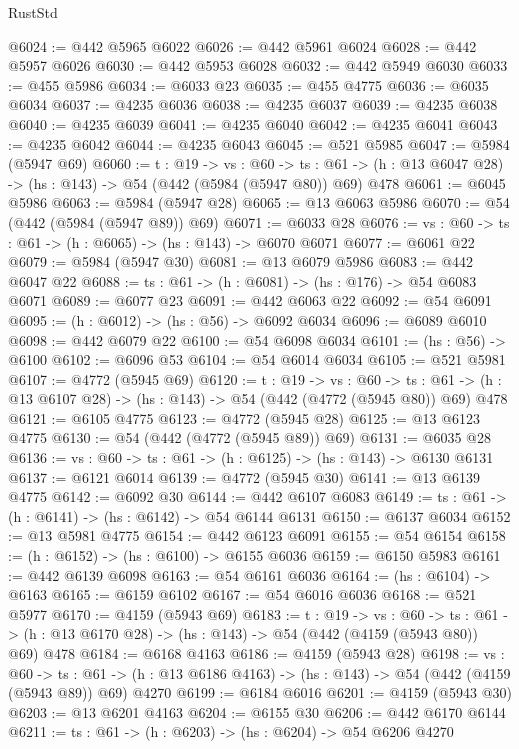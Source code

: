 \begin{lexlean}{RustStd}
\begin{coremodule}
@6024 := @442 @5965 @6022
@6026 := @442 @5961 @6024
@6028 := @442 @5957 @6026
@6030 := @442 @5953 @6028
@6032 := @442 @5949 @6030
@6033 := @455 @5986
@6034 := @6033 @23
@6035 := @455 @4775
@6036 := @6035 @6034
@6037 := @4235 @6036
@6038 := @4235 @6037
@6039 := @4235 @6038
@6040 := @4235 @6039
@6041 := @4235 @6040
@6042 := @4235 @6041
@6043 := @4235 @6042
@6044 := @4235 @6043
@6045 := @521 @5985
@6047 := @5984 (@5947 @69)
@6060 := {t : @19} ->
  {vs : @60} ->
  {ts : @61} -> (h : @13 @6047 @28) -> (hs : @143) -> @54 (@442 (@5984 (@5947 @80)) @69) @478
@6061 := @6045 @5986
@6063 := @5984 (@5947 @28)
@6065 := @13 @6063 @5986
@6070 := @54 (@442 (@5984 (@5947 @89)) @69)
@6071 := @6033 @28
@6076 := {vs : @60} -> {ts : @61} -> (h : @6065) -> (hs : @143) -> @6070 @6071
@6077 := @6061 @22
@6079 := @5984 (@5947 @30)
@6081 := @13 @6079 @5986
@6083 := @442 @6047 @22
@6088 := {ts : @61} -> (h : @6081) -> (hs : @176) -> @54 @6083 @6071
@6089 := @6077 @23
@6091 := @442 @6063 @22
@6092 := @54 @6091
@6095 := (h : @6012) -> (hs : @56) -> @6092 @6034
@6096 := @6089 @6010
@6098 := @442 @6079 @22
@6100 := @54 @6098 @6034
@6101 := (hs : @56) -> @6100
@6102 := @6096 @53
@6104 := @54 @6014 @6034
@6105 := @521 @5981
@6107 := @4772 (@5945 @69)
@6120 := {t : @19} ->
  {vs : @60} ->
  {ts : @61} -> (h : @13 @6107 @28) -> (hs : @143) -> @54 (@442 (@4772 (@5945 @80)) @69) @478
@6121 := @6105 @4775
@6123 := @4772 (@5945 @28)
@6125 := @13 @6123 @4775
@6130 := @54 (@442 (@4772 (@5945 @89)) @69)
@6131 := @6035 @28
@6136 := {vs : @60} -> {ts : @61} -> (h : @6125) -> (hs : @143) -> @6130 @6131
@6137 := @6121 @6014
@6139 := @4772 (@5945 @30)
@6141 := @13 @6139 @4775
@6142 := @6092 @30
@6144 := @442 @6107 @6083
@6149 := {ts : @61} -> (h : @6141) -> (hs : @6142) -> @54 @6144 @6131
@6150 := @6137 @6034
@6152 := @13 @5981 @4775
@6154 := @442 @6123 @6091
@6155 := @54 @6154
@6158 := (h : @6152) -> (hs : @6100) -> @6155 @6036
@6159 := @6150 @5983
@6161 := @442 @6139 @6098
@6163 := @54 @6161 @6036
@6164 := (hs : @6104) -> @6163
@6165 := @6159 @6102
@6167 := @54 @6016 @6036
@6168 := @521 @5977
@6170 := @4159 (@5943 @69)
@6183 := {t : @19} ->
  {vs : @60} ->
  {ts : @61} -> (h : @13 @6170 @28) -> (hs : @143) -> @54 (@442 (@4159 (@5943 @80)) @69) @478
@6184 := @6168 @4163
@6186 := @4159 (@5943 @28)
@6198 := {vs : @60} ->
  {ts : @61} -> (h : @13 @6186 @4163) -> (hs : @143) -> @54 (@442 (@4159 (@5943 @89)) @69) @4270
@6199 := @6184 @6016
@6201 := @4159 (@5943 @30)
@6203 := @13 @6201 @4163
@6204 := @6155 @30
@6206 := @442 @6170 @6144
@6211 := {ts : @61} -> (h : @6203) -> (hs : @6204) -> @54 @6206 @4270

\end{coremodule}
\end{lexlean}
